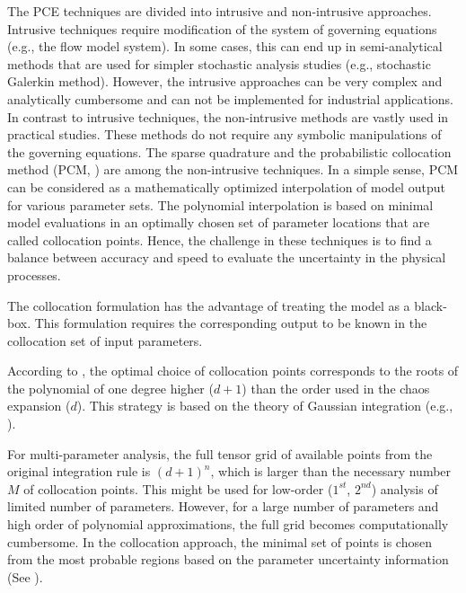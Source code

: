 The PCE techniques are divided into intrusive
\cite{Ghanem1993,Matthies2005,Xiu2003} and non-intrusive
\cite{Keese2003,Isukapalli1998,nLi2007,oladyshkinintegrative} approaches.
Intrusive techniques require modification of the system of governing
equations (e.g., the flow model system). In some cases, this can end up in semi-analytical methods that are
used for simpler stochastic analysis studies (e.g., stochastic Galerkin
method). However, the intrusive approaches can be very complex and analytically
cumbersome and can not be implemented for industrial applications. In contrast
to intrusive techniques, the non-intrusive methods are vastly used in practical
studies. These methods do not require any symbolic manipulations of the
governing equations. The sparse quadrature and the probabilistic collocation
method (PCM, \cite{nLi2007,oladyshkinintegrative}) are among the non-intrusive
techniques. In a simple sense, PCM can be considered as a mathematically
optimized interpolation of model output for various parameter sets. The
polynomial interpolation is based on minimal model evaluations in an optimally
chosen set of parameter locations that are called collocation points. Hence, the challenge in these techniques is to find a balance between accuracy and speed
to evaluate the uncertainty in the physical processes.

The collocation formulation has the advantage of treating the model as a
black-box. This formulation requires the corresponding output to be known in
the collocation set of input parameters.

According to \cite{Villadsen1978}, the optimal choice of collocation
points corresponds to the roots of the polynomial of one degree higher ($d+1$)
than the order used in the chaos expansion ($d$). This strategy is based on the
theory of Gaussian integration (e.g., \cite{Abramowitz1965}). 

For multi-parameter analysis, the full tensor grid of available points from the
original integration rule is $(d+1)^n$, which is larger than the necessary
number
$M$ of collocation points. This might be used for low-order
($1^{st}$, $2^{nd}$) analysis of limited number of parameters. However, for
a large number of parameters and high order of polynomial approximations, the
full grid becomes computationally cumbersome. In the collocation approach,
the minimal set of points is chosen from the most probable regions based on the parameter uncertainty information (See
\cite{nLi2007,oladyshkinintegrative,oladyshkin2011concept}). 

